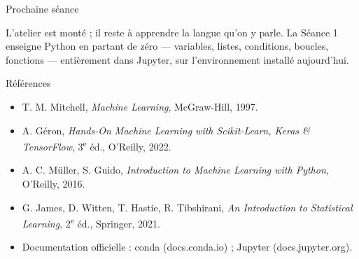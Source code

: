 \documentclass[aspectratio=169,11pt]{beamer}
\begin{document}
\begin{frame}{Prochaine séance}
\begin{ucadfront}
{\small L'atelier est monté ; il reste à apprendre la langue qu'on y parle. La Séance 1 enseigne Python en partant de zéro — variables, listes, conditions, boucles, fonctions — entièrement dans Jupyter, sur l'environnement installé aujourd'hui.}
\end{ucadfront}
\end{frame}

\begin{frame}{Références}
\begin{itemize}\small
  \item T. M. Mitchell, \emph{Machine Learning}, McGraw-Hill, 1997.
  \item A. Géron, \emph{Hands-On Machine Learning with Scikit-Learn, Keras \& TensorFlow}, 3\textsuperscript{e} éd., O'Reilly, 2022.
  \item A. C. Müller, S. Guido, \emph{Introduction to Machine Learning with Python}, O'Reilly, 2016.
  \item G. James, D. Witten, T. Hastie, R. Tibshirani, \emph{An Introduction to Statistical Learning}, 2\textsuperscript{e} éd., Springer, 2021.
  \item Documentation officielle : conda (docs.conda.io) ; Jupyter (docs.jupyter.org).
\end{itemize}
\end{frame}
\end{document}
